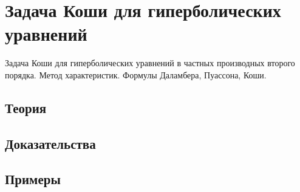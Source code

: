 
\section{Задача Коши для гиперболических уравнений}
\label{sec:2.1.02-hyperbolic-cauchy}

\begin{ticket}
Задача Коши для гиперболических уравнений в частных производных второго порядка. Метод характеристик. Формулы Даламбера, Пуассона, Коши.
\end{ticket}

\subsection*{Теория}

\subsection*{Доказательства}

\subsection*{Примеры}

